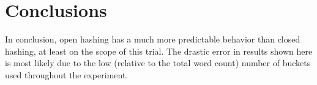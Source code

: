 \documentclass{article}
\begin{document}
\section{Conclusions}
In conclusion, open hashing has a much more predictable behavior than closed
hashing, at least on the scope of this trial.  The drastic error in results
shown here is most likely due to the low (relative to the total word count)
number of buckets used throughout the experiment.
\end{document}
